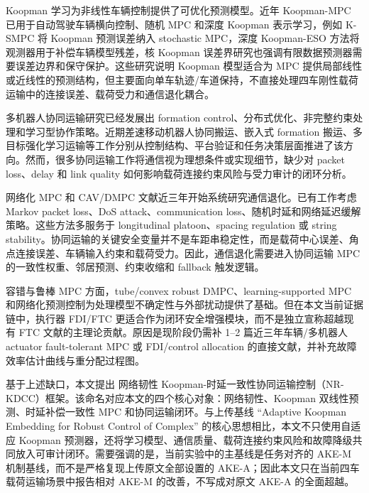 \documentclass[twocolumn,3p,times,procedia]{elsarticle}
\newcommand{\AKE}{AKE-M}
\newcommand{\Method}{NR-KDCC}
\newcommand{\MethodCN}{网络韧性 Koopman-时延一致性协同运输控制}
\begin{document}
Koopman 学习为非线性车辆控制提供了可优化预测模型。近年 Koopman-MPC 已用于自动驾驶车辆横向控制、随机 MPC 和深度 Koopman 表示学习，例如 K-SMPC 将 Koopman 预测误差纳入 stochastic MPC，深度 Koopman-ESO 方法将观测器用于补偿车辆模型残差，核 Koopman 误差界研究也强调有限数据预测器需要误差边界和保守保护\cite{kim2025ksmpc,chen2024esoDeepKoopman,philipp2023koopmanErrorBounds,cibulka2021koopmanVehicleMpc}。这些研究说明 Koopman 模型适合为 MPC 提供局部线性或近线性的预测结构，但主要面向单车轨迹/车道保持，不直接处理四车刚性载荷运输中的连接误差、载荷受力和通信退化耦合。

多机器人协同运输研究已经发展出 formation control、分布式优化、非完整约束处理和学习型协作策略。近期差速移动机器人协同搬运、嵌入式 formation 搬运、多目标强化学习运输等工作分别从控制结构、平台验证和任务决策层面推进了该方向\cite{cooperativeTransport2024ras,embeddedFormationTransport2024cep,multiObjectiveTransport2024mechatronics,intelligentCollaborativeTransport2024}。然而，很多协同运输工作将通信视为理想条件或实现细节，缺少对 packet loss、delay 和 link quality 如何影响载荷连接约束风险与受力审计的闭环分析。

网络化 MPC 和 CAV/DMPC 文献近三年开始系统研究通信退化。已有工作考虑 Markov packet loss、DoS attack、communication loss、随机时延和网络延迟缓解策略\cite{bian2025markovPacketLossDMPC,dosDMPC2024isa,robustCommunicationLoss2025trb,bao2024robustUkfMpc,networkLatencyCav2024sensors,dai2024networkedPredictiveControl}。这些方法多服务于 longitudinal platoon、spacing regulation 或 string stability。协同运输的关键安全变量并不是车距串稳定性，而是载荷中心误差、角点连接误差、车辆输入约束和载荷受力。因此，通信退化需要进入协同运输 MPC 的一致性权重、邻居预测、约束收缩和 fallback 触发逻辑。

容错与鲁棒 MPC 方面，tube/convex robust DMPC、learning-supported MPC 和网络化预测控制为处理模型不确定性与外部扰动提供了基础\cite{convexRobustDMPC2025ejc,gasparino2023nnMpcUncertainty,dai2024networkedPredictiveControl}。但在本文当前证据链中，执行器 FDI/FTC 更适合作为闭环安全增强模块，而不是独立宣称超越现有 FTC 文献的主理论贡献。原因是现阶段仍需补 1--2 篇近三年车辆/多机器人 actuator fault-tolerant MPC 或 FDI/control allocation 的直接文献，并补充故障效率估计曲线与重分配过程图。

基于上述缺口，本文提出 \MethodCN{}（\Method{}）框架。该命名对应本文的四个核心对象：网络韧性、Koopman 双线性预测、时延补偿一致性 MPC 和协同运输闭环。与上传基线 ``Adaptive Koopman Embedding for Robust Control of Complex'' 的核心思想相比，本文不只使用自适应 Koopman 预测器，还将学习模型、通信质量、载荷连接约束风险和故障降级共同放入可审计闭环。需要强调的是，当前实验中的主基线是任务对齐的 \AKE{} 机制基线，而不是严格复现上传原文全部设置的 AKE-A；因此本文只在当前四车载荷运输场景中报告相对 \AKE{} 的改善，不写成对原文 AKE-A 的全面超越。
\end{document}
